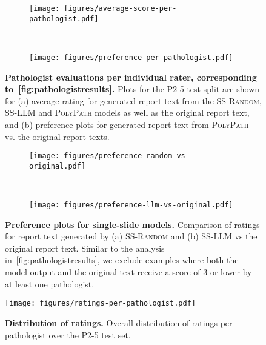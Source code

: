 \documentclass[11pt]{article}
\newcommand{\ourmodel}{\textsc{PolyPath}\xspace}
\newcommand{\randommodel}{\textsc{SS-Random}\xspace}
\newcommand{\llmmodel}{\textsc{SS-LLM}\xspace}
\begin{document}
\begin{figure}[h]
\centering
  \begin{subfigure}[b]{\textwidth}
    \centering
    \texttt{[image: figures/average-score-per-pathologist.pdf]}
    \caption{}
    \label{fig:averagescoreperpathologist}
  \end{subfigure}
  \\
  \begin{subfigure}[b]{\textwidth}
  \centering
  \texttt{[image: figures/preference-per-pathologist.pdf]}
  \caption{}
  \label{fig:preferenceperpathologist}
  \end{subfigure}
\caption{\small \textbf{Pathologist evaluations per individual rater, corresponding to~\autoref{fig:pathologistresults}.}  Plots for the P2-5 test split are shown for (a) average rating for generated report text from the \randommodel, \llmmodel and \ourmodel models as well as the original report text, and (b) preference plots for generated report text from \ourmodel vs. the original report texts.}
\label{fig:perpathologist}
\end{figure}


\begin{figure}[h]
\centering
  \begin{subfigure}[b]{\textwidth}
    \centering
    \texttt{[image: figures/preference-random-vs-original.pdf]}
    \caption{}
    \label{fig:preferencerandomvsoriginal}
  \end{subfigure}
  \\
  \begin{subfigure}[b]{\textwidth}
  \centering
  \texttt{[image: figures/preference-llm-vs-original.pdf]}
  \caption{}
  \label{fig:preferencellmvsoriginal}
  \end{subfigure}
\caption{\small \textbf{Preference plots for single-slide models.} Comparison of ratings for report text generated by (a) \randommodel and (b) \llmmodel vs the original report text. Similar to the analysis in~\autoref{fig:pathologistresults}, we exclude examples where both the model output and the original text receive a score of 3 or lower by at least one pathologist.}
\label{fig:preferencebaselines}
\end{figure}


\begin{figure}
    \centering
    \texttt{[image: figures/ratings-per-pathologist.pdf]}
    \caption{\small \textbf{Distribution of ratings.} Overall distribution of ratings per pathologist over the P2-5 test set.}
    \label{fig:ratingsperpathologist}
\end{figure}
\end{document}
